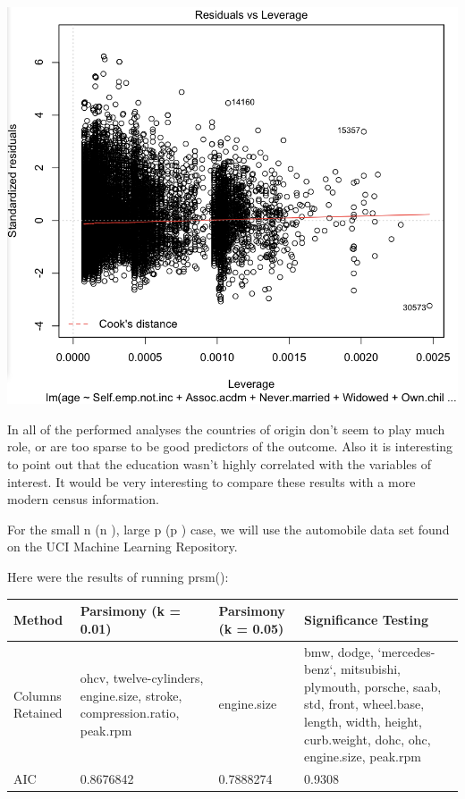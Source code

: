 \documentclass[letter]{article}
\begin{document}
 \includegraphics[scale=0.5]{cookResidCensus.png}

In all of the performed analyses the countries of origin don't seem to play much role, or are too sparse to be good predictors of the outcome. Also it is interesting to point out that the education wasn't highly correlated with the variables of interest. It would be very interesting to compare these results with a more modern census information.

\newpage


For the small n (n ), large p (p ) case, we will use the automobile data set found on the UCI Machine Learning Repository.

Here were the results of running prsm(): \\

\begin{center}
    \begin{tabular}{ | l |  p{4cm} |  p{4cm} | p{4cm} |}
    \hline
    Method & Parsimony (k = 0.01) & Parsimony (k = 0.05) & Significance Testing \\ \hline
    
    Columns Retained & ohcv, twelve-cylinders, engine.size, stroke, compression.ratio, peak.rpm & engine.size & bmw, dodge, `mercedes-benz`, mitsubishi, plymouth, porsche, saab, std, front, wheel.base, length, width, height, curb.weight, dohc, ohc, engine.size, peak.rpm\\ \hline
    
    AIC & 0.8676842 & 0.7888274 & 0.9308\\ \hline
    
    \end{tabular}
\end{center}
\end{document}
